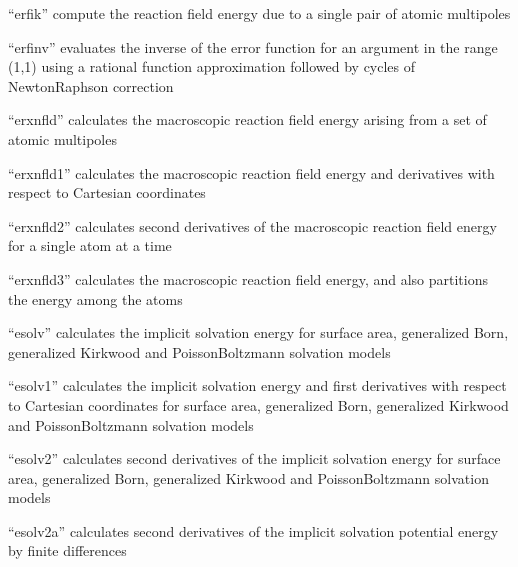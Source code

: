 \documentclass[letterpaper,11pt,english]{sphinxmanual}
\begin{document}

“erfik” compute the reaction field energy due to a single pair
of atomic multipoles


“erfinv” evaluates the inverse of the error function for
an argument in the range (\sphinxhyphen{}1,1) using a rational function
approximation followed by cycles of Newton\sphinxhyphen{}Raphson correction


“erxnfld” calculates the macroscopic reaction field energy
arising from a set of atomic multipoles


“erxnfld1” calculates the macroscopic reaction field energy
and derivatives with respect to Cartesian coordinates


“erxnfld2” calculates second derivatives of the macroscopic
reaction field energy for a single atom at a time


“erxnfld3” calculates the macroscopic reaction field energy,
and also partitions the energy among the atoms


“esolv” calculates the implicit solvation energy for surface area,
generalized Born, generalized Kirkwood and Poisson\sphinxhyphen{}Boltzmann
solvation models


“esolv1” calculates the implicit solvation energy and
first derivatives with respect to Cartesian coordinates
for surface area, generalized Born, generalized Kirkwood
and Poisson\sphinxhyphen{}Boltzmann solvation models


“esolv2” calculates second derivatives of the implicit
solvation energy for surface area, generalized Born,
generalized Kirkwood and Poisson\sphinxhyphen{}Boltzmann solvation models


“esolv2a” calculates second derivatives of the implicit solvation
potential energy by finite differences

\end{document}
